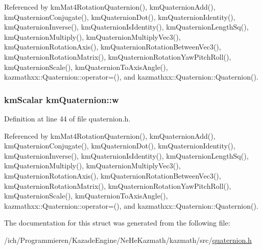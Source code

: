 Referenced by kmMat4RotationQuaternion(), kmQuaternionAdd(), kmQuaternionConjugate(), kmQuaternionDot(), kmQuaternionIdentity(), kmQuaternionInverse(), kmQuaternionIsIdentity(), kmQuaternionLengthSq(), kmQuaternionMultiply(), kmQuaternionMultiplyVec3(), kmQuaternionRotationAxis(), kmQuaternionRotationBetweenVec3(), kmQuaternionRotationMatrix(), kmQuaternionRotationYawPitchRoll(), kmQuaternionScale(), kmQuaternionToAxisAngle(), kazmathxx::Quaternion::operator=(), and kazmathxx::Quaternion::Quaternion().\hypertarget{structkm_quaternion_3278d1a1de6f6d29ca9fa08bde51e726}{
\subsubsection[w]{\setlength{\rightskip}{0pt plus 5cm}kmScalar {\bf kmQuaternion::w}}}
\label{structkm_quaternion_3278d1a1de6f6d29ca9fa08bde51e726}




Definition at line 44 of file quaternion.h.

Referenced by kmMat4RotationQuaternion(), kmQuaternionAdd(), kmQuaternionConjugate(), kmQuaternionDot(), kmQuaternionIdentity(), kmQuaternionInverse(), kmQuaternionIsIdentity(), kmQuaternionLengthSq(), kmQuaternionMultiply(), kmQuaternionMultiplyVec3(), kmQuaternionRotationAxis(), kmQuaternionRotationBetweenVec3(), kmQuaternionRotationMatrix(), kmQuaternionRotationYawPitchRoll(), kmQuaternionScale(), kmQuaternionToAxisAngle(), kazmathxx::Quaternion::operator=(), and kazmathxx::Quaternion::Quaternion().

The documentation for this struct was generated from the following file:\begin{CompactItemize}
\item 
/ich/Programmieren/KazadeEngine/NeHeKazmath/kazmath/src/\hyperlink{quaternion_8h}{quaternion.h}\end{CompactItemize}
